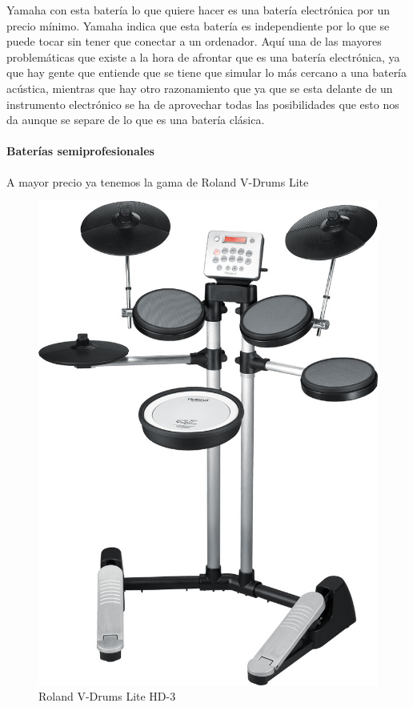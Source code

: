\documentclass[a4paper,11pt,oneside]{book}
\begin{document}
Yamaha con esta batería lo que quiere hacer es una batería electrónica por un precio mínimo. Yamaha indica que esta batería es independiente por lo que se puede tocar sin tener que conectar a un ordenador. Aquí una de las mayores problemáticas que existe a la hora de afrontar que es una batería electrónica, ya que hay gente que entiende que se tiene que simular lo más cercano a una batería acústica, mientras que hay otro razonamiento que ya que se esta delante de un instrumento electrónico se ha de aprovechar todas las posibilidades que esto nos da aunque se separe de lo que es una batería clásica.


\paragraph{Baterías semiprofesionales}

 A mayor precio ya tenemos la gama de Roland V-Drums Lite
 
\begin{figure}[H]
\begin{center}
\includegraphics[scale=0.2]{Imagenes/V-Drums_Lite_HD-3.jpg}
\caption{Roland V-Drums Lite HD-3}
\label{Roland V-Drums Lite HD-3}
\end{center}
\end{figure}
\end{document}
